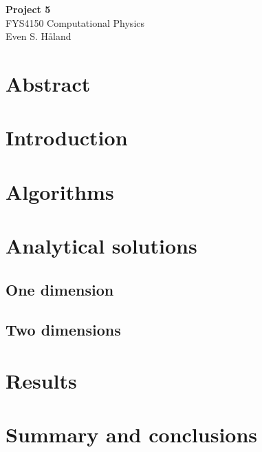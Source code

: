 \documentclass[12pt, a4paper]{article}
\begin{document}
\begin{titlepage}
\begin{center}
\vspace*{3cm}
\Huge
\textbf{Project 5} \\
\Large  
FYS4150 Computational Physics 
\vspace*{3cm} \\ 

Even S. Håland 
\vspace*{5cm} \\

\normalsize
\section*{Abstract}


\end{center}
\end{titlepage}

\section{Introduction}

\section{Algorithms}

\section{Analytical solutions}

\subsection{One dimension}

\subsection{Two dimensions}

\section{Results}

\section{Summary and conclusions}
\end{document}
